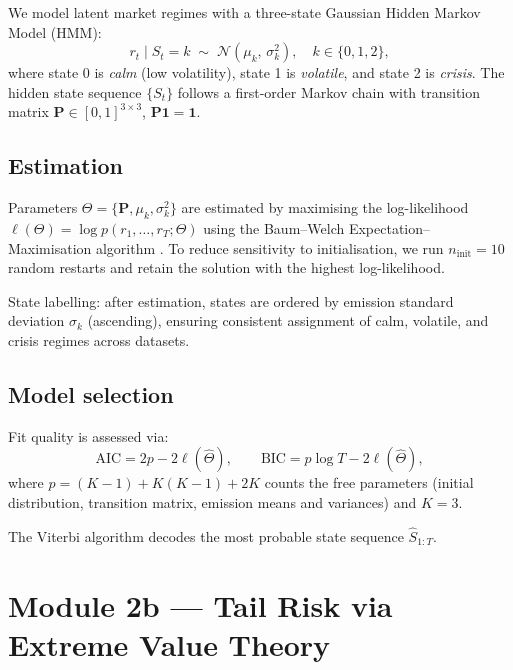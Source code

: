 \documentclass[12pt]{article}
\begin{document}
We model latent market regimes with a three-state Gaussian Hidden
Markov Model (HMM):
\begin{equation}
  r_t \mid S_t = k \;\sim\; \mathcal{N}(\mu_k,\, \sigma_k^2),
  \quad k \in \{0, 1, 2\},
\end{equation}
where state 0 is \emph{calm} (low volatility), state 1 is
\emph{volatile}, and state 2 is \emph{crisis}.  The hidden state
sequence $\{S_t\}$ follows a first-order Markov chain with
transition matrix $\mathbf{P} \in [0,1]^{3\times 3}$, $\mathbf{P}\mathbf{1}=\mathbf{1}$.

\subsection{Estimation}

Parameters $\Theta = \{\mathbf{P}, \mu_k, \sigma_k^2\}$ are
estimated by maximising the log-likelihood
$\ell(\Theta) = \log p(r_1,\ldots,r_T;\Theta)$
using the Baum--Welch Expectation--Maximisation algorithm
\citep{BaumWelch1972}.  To reduce sensitivity to initialisation,
we run $n_{\text{init}} = 10$ random restarts and retain the
solution with the highest log-likelihood.

State labelling: after estimation, states are ordered by emission
standard deviation $\sigma_k$ (ascending), ensuring consistent
assignment of calm, volatile, and crisis regimes across datasets.

\subsection{Model selection}

Fit quality is assessed via:
\begin{equation}
  \text{AIC} = 2p - 2\ell(\hat\Theta), \qquad
  \text{BIC} = p\log T - 2\ell(\hat\Theta),
\end{equation}
where $p = (K-1) + K(K-1) + 2K$ counts the free parameters
(initial distribution, transition matrix, emission means and
variances) and $K=3$.

The Viterbi algorithm decodes the most probable state sequence
$\hat S_{1:T}$.

\section{Module 2b — Tail Risk via Extreme Value Theory}
\end{document}
